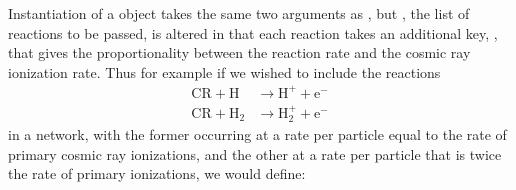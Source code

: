 \documentclass[letterpaper,10pt,english]{sphinxmanual}
\begin{document}
Instantiation of a  object takes the same two
arguments as {\hyperref[chemistry:ssssec\string-reaction\string-matrix]{}}, but , the
list of reactions to be passed, is altered in that each reaction takes
an additional key, , that gives the proportionality between
the reaction rate and the cosmic ray ionization rate. Thus for example
if we wished to include the reactions
\begin{equation*}
\begin{split}\mathrm{CR} + \mathrm{H} & \rightarrow \mathrm{H}^+ +
\mathrm{e}^- \\
\mathrm{CR} + \mathrm{H}_2 & \rightarrow \mathrm{H}_2^+ +
\mathrm{e}^-\end{split}
\end{equation*}
in a network, with the former occurring at a rate per particle equal to
the rate of primary cosmic ray ionizations, and the other at a rate
per particle that is twice the rate of primary ionizations, we would
define:
\end{document}
